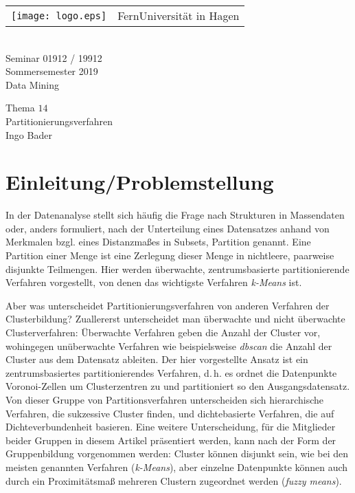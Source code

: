 \documentclass[a4paper,12pt,twoside]{article}
\newcommand{\Fachbegriff}[1]{\textit{#1}}
\newcommand{\No}{$14$}
\newcommand{\Theme}{Partitionierungsverfahren}
\newcommand{\Name}{Ingo Bader}
\begin{document}
\thispagestyle{empty}
\pagestyle{empty}

\begin{center}
\begin{huge}
\vspace*{3cm}
    \begin{tabular}{m{1.2cm}@{\ \ }m{9cm}}
      \texttt{[image: logo.eps]} & {FernUniversität in Hagen}
    \end{tabular}
    \\
    \vspace*{3cm}
   Seminar 01912 / 19912 \\
   Sommersemester 2019 \\[2em]
   \glqq{}Data Mining\grqq{} \\[2cm]
\end{huge}
\begin{large}
   Thema \No\\[1em]
   \Theme\\[3cm]
   \Name
\end{large}
\end{center}

\clearpage
\tableofcontents
\clearpage
\raggedbottom
\thispagestyle{fancy}
\pagestyle{fancy}
\setcounter{page}{1}

\section{Einleitung/Problemstellung}
In der Datenanalyse stellt sich häufig die Frage nach Strukturen in Massendaten oder, anders formuliert, nach der Unterteilung eines Datensatzes anhand von Merkmalen bzgl. eines Distanzmaßes in Subsets, Partition genannt. Eine Partition einer Menge ist eine Zerlegung dieser Menge in nichtleere, paarweise disjunkte Teilmengen. Hier werden überwachte, zentrumsbasierte partitionierende Verfahren vorgestellt, von denen das wichtigste Verfahren \Fachbegriff{k-Means} ist.

Aber was unterscheidet Partitionierungsverfahren von anderen Verfahren der Clusterbildung? Zuallererst unterscheidet man überwachte und nicht überwachte Clusterverfahren: Überwachte Verfahren geben die Anzahl der Cluster vor, wohingegen unüberwachte Verfahren wie beispielsweise \Fachbegriff{dbscan} die Anzahl der Cluster aus dem Datensatz ableiten. Der hier vorgestellte Ansatz ist ein zentrumsbasiertes partitionierendes Verfahren, d.\,h. es ordnet die Datenpunkte Voronoi-Zellen um Clusterzentren zu und partitioniert so den Ausgangsdatensatz. Von dieser Gruppe von Partitionsverfahren unterscheiden sich hierarchische Verfahren, die sukzessive Cluster finden, und dichtebasierte Verfahren, die auf Dichteverbundenheit basieren. Eine weitere Unterscheidung, für die Mitglieder beider Gruppen in diesem Artikel präsentiert werden, kann nach der Form der Gruppenbildung vorgenommen werden: Cluster können disjunkt sein, wie bei den meisten genannten Verfahren (\Fachbegriff{k-Means}), aber einzelne Datenpunkte können auch durch ein Proximitätsmaß mehreren Clustern zugeordnet werden (\Fachbegriff{fuzzy means}).  \autocite{Saket.2016}
\end{document}
